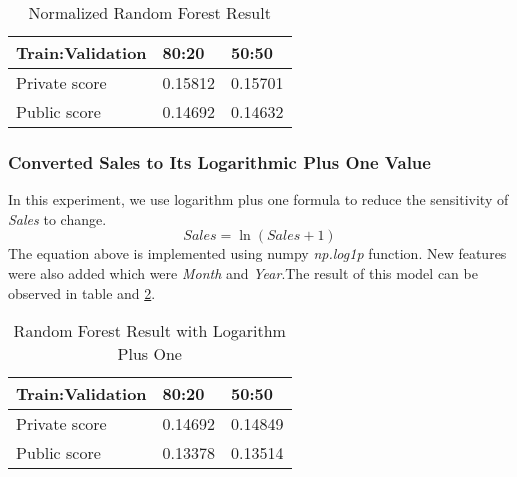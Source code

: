 \begin{table}[h]
	\centering
	\caption{Normalized Random Forest Result }
	\label{tab:random_forest_result_1}
	\begin{tabular}{|m{150pt}|m{50pt}|m{50pt}|}
		\hline
		\textbf{Train:Validation}& \textbf{80:20}& \textbf{50:50}  \\ \hline
		Private score & 0.15812 & 0.15701  \\ \hline
		Public score  & 0.14692 & 0.14632\\ \hline
	\end{tabular}
\end{table}

\subsubsection{Converted Sales to Its Logarithmic Plus One Value}
In this experiment, we use logarithm plus one formula to reduce the sensitivity of   \textit{Sales} to change.  
\begin{equation}
\label{eq:logarithm plus one}
Sales = \ln (Sales + 1)
\end{equation}
The equation above is implemented using numpy \textit{np.log1p} function.
New features were also added which were \textit{Month} and \textit{Year}.The result of this model can be observed in table and \ref{tab:rf_log_2}.
\begin{table}[h]
	\centering
	\caption{Random Forest Result with Logarithm Plus One}
	\label{tab:rf_log_2}
	\begin{tabular}{|m{150pt}|m{50pt}|m{50pt}|}
		\hline
		\textbf{Train:Validation}&\textbf{80:20}&\textbf{50:50} \\ \hline
		Private score & 0.14692 & 0.14849 \\ \hline
		Public score  & 0.13378 & 0.13514 \\ \hline
	\end{tabular}
\end{table}



